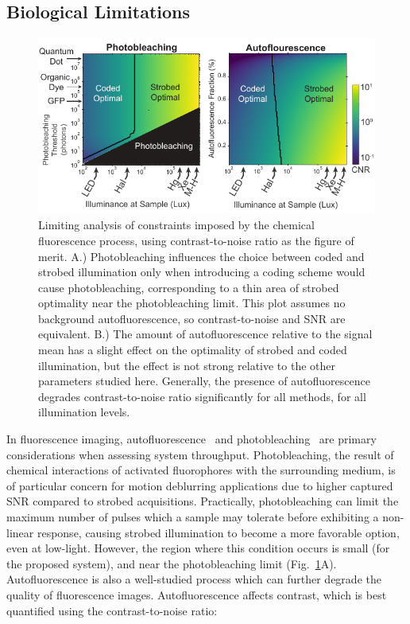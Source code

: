 \subsection{Biological Limitations}

\begin{figure}
  \centering
    \includegraphics[width=\textwidth]{figures/fig_highthroughput_fluorescence_analysis.pdf}
      \caption{\label{fig:fluorescence_analysis} Limiting analysis of constraints imposed by the chemical fluorescence process, using contrast-to-noise ratio as the figure of merit. A.) Photobleaching influences the choice between coded and strobed illumination only when introducing a coding scheme would cause photobleaching, corresponding to a thin area of strobed optimality near the photobleaching limit. This plot assumes no background autofluorescence, so contrast-to-noise and SNR are equivalent. B.) The amount of autofluorescence relative to the signal mean has a slight effect on the optimality of strobed and coded illumination, but the effect is not strong relative to the other parameters studied here. Generally, the presence of autofluorescence degrades contrast-to-noise ratio significantly for all methods, for all illumination levels.}
\end{figure}

In fluorescence imaging, autofluorescence~\cite{autofluor} and photobleaching~\cite{lippincott2003photobleaching} are primary considerations when assessing system throughput. Photobleaching, the result of chemical interactions of activated fluorophores with the surrounding medium, is of particular concern for motion deblurring applications due to higher captured SNR compared to strobed acquisitions. Practically, photobleaching can limit the maximum number of pulses which a sample may tolerate before exhibiting a non-linear response, causing strobed illumination to become a more favorable option, even at low-light. However, the region where this condition occurs is small (for the proposed system), and near the photobleaching limit (Fig.~\ref{fig:fluorescence_analysis}A). Autofluorescence is also a well-studied process which can further degrade the quality of fluorescence images. Autofluorescence affects contrast, which is best quantified using the contrast-to-noise ratio:

